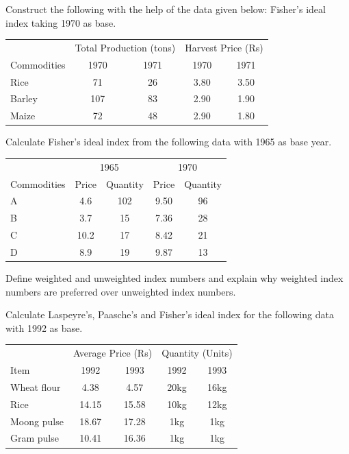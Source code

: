 \documentclass[11pt,a4paper]{article}
\begin{document}
\begin{longlist}
\item Construct the following with the help of the data given below: Fisher's ideal index taking 1970 as base.
\begin{center}
\begin{tabular}{l cc cc}
\toprule
& \multicolumn{2}{c}{Total Production (tons)} & \multicolumn{2}{c}{Harvest Price (Rs)} \\
Commodities & 1970 & 1971 & 1970 & 1971 \\
\midrule
Rice & 71 & 26 & 3.80 & 3.50 \\
Barley & 107 & 83 & 2.90 & 1.90 \\
Maize & 72 & 48 & 2.90 & 1.80 \\
\bottomrule
\end{tabular}
\end{center}

\item Calculate Fisher's ideal index from the following data with 1965 as base year.
\begin{center}
\begin{tabular}{l cccc}
\toprule
& \multicolumn{2}{c}{1965} & \multicolumn{2}{c}{1970} \\
Commodities & Price & Quantity & Price & Quantity \\
\midrule
A & 4.6 & 102 & 9.50 & 96 \\
B & 3.7 & 15 & 7.36 & 28 \\
C & 10.2 & 17 & 8.42 & 21 \\
D & 8.9 & 19 & 9.87 & 13 \\
\bottomrule
\end{tabular}
\end{center}

\item Define weighted and unweighted index numbers and explain why weighted index numbers are preferred over unweighted index numbers.

\item Calculate Laspeyre's, Paasche's and Fisher's ideal index for the following data with 1992 as base.
\begin{center}
\begin{tabular}{l cc cc}
\toprule
& \multicolumn{2}{c}{Average Price (Rs)} & \multicolumn{2}{c}{Quantity (Units)} \\
Item & 1992 & 1993 & 1992 & 1993 \\
\midrule
Wheat flour & 4.38 & 4.57 & 20kg & 16kg \\
Rice & 14.15 & 15.58 & 10kg & 12kg \\
Moong pulse & 18.67 & 17.28 & 1kg & 1kg \\
Gram pulse & 10.41 & 16.36 & 1kg & 1kg \\
\bottomrule
\end{tabular}
\end{center}


\end{longlist}
\end{document}
